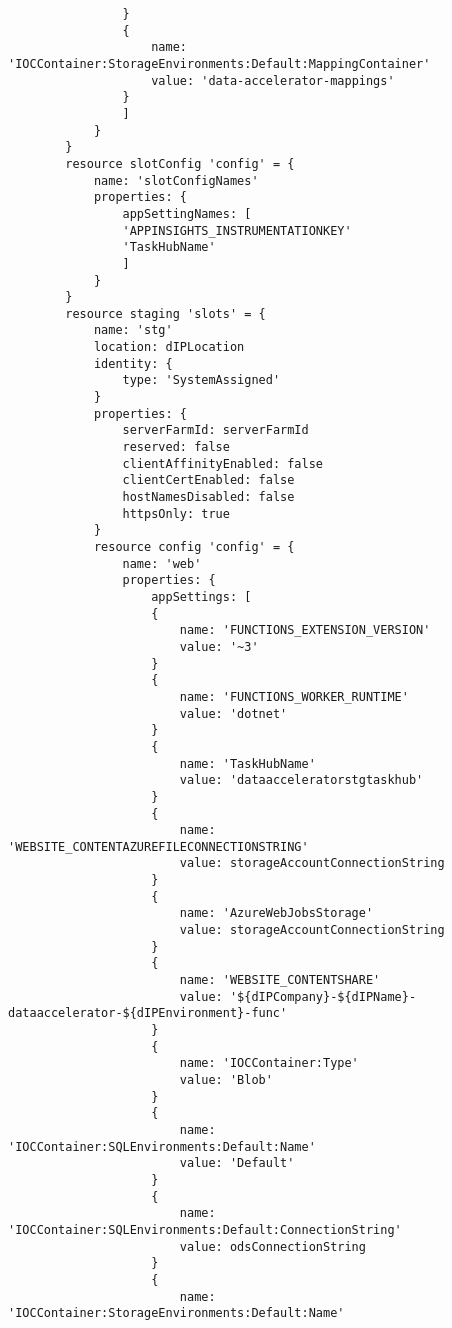 \documentclass[dutch,dit,thesis]{hogentreport}
\begin{document}
\begin{lstlisting}
                }
                {
                    name: 'IOCContainer:StorageEnvironments:Default:MappingContainer'
                    value: 'data-accelerator-mappings'
                }
                ]
            }
        }
        resource slotConfig 'config' = {
            name: 'slotConfigNames'
            properties: {
                appSettingNames: [
                'APPINSIGHTS_INSTRUMENTATIONKEY'
                'TaskHubName'
                ]
            }
        }
        resource staging 'slots' = {
            name: 'stg'
            location: dIPLocation
            identity: {
                type: 'SystemAssigned'
            }
            properties: {
                serverFarmId: serverFarmId
                reserved: false
                clientAffinityEnabled: false
                clientCertEnabled: false
                hostNamesDisabled: false
                httpsOnly: true
            }
            resource config 'config' = {
                name: 'web'
                properties: {
                    appSettings: [
                    {
                        name: 'FUNCTIONS_EXTENSION_VERSION'
                        value: '~3'
                    }
                    {
                        name: 'FUNCTIONS_WORKER_RUNTIME'
                        value: 'dotnet'
                    }
                    {
                        name: 'TaskHubName'
                        value: 'dataacceleratorstgtaskhub'
                    }
                    {
                        name: 'WEBSITE_CONTENTAZUREFILECONNECTIONSTRING'
                        value: storageAccountConnectionString
                    }
                    {
                        name: 'AzureWebJobsStorage'
                        value: storageAccountConnectionString
                    }
                    {
                        name: 'WEBSITE_CONTENTSHARE'
                        value: '${dIPCompany}-${dIPName}-dataaccelerator-${dIPEnvironment}-func'
                    }
                    {
                        name: 'IOCContainer:Type'
                        value: 'Blob'
                    }
                    {
                        name: 'IOCContainer:SQLEnvironments:Default:Name'
                        value: 'Default'
                    }
                    {
                        name: 'IOCContainer:SQLEnvironments:Default:ConnectionString'
                        value: odsConnectionString
                    }
                    {
                        name: 'IOCContainer:StorageEnvironments:Default:Name'

\end{lstlisting}
\end{document}
